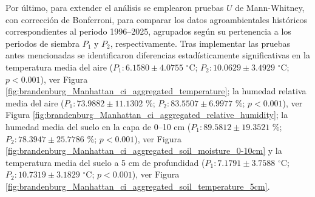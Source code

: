 Por último, para extender el análisis se emplearon pruebas $U$ de Mann-Whitney, con corrección de Bonferroni, para comparar los datos agroambientales históricos correspondientes al periodo 1996--2025, agrupados según su pertenencia a los periodos de siembra $P_1$ y $P_2$, respectivamente.  Tras implementar las pruebas antes mencionadas se identificaron diferencias estadísticamente significativas en la temperatura media del aire ($P_1:	6.1580	\pm	4.0755$ $^\circ$C; 	$P_2:	10.0629	\pm	3.4929$ $^\circ$C; 	$p<0.001$), ver Figura \ref{fig:brandenburg_Manhattan_ci_aggregated_temperature}; la humedad relativa media del aire ($P_1:	73.9882	\pm	11.1302	$ \%; 	$P_2:	83.5507\pm	6.9977$ \%; 	$p<0.001$), ver Figura \ref{fig:brandenburg_Manhattan_ci_aggregated_relative_humidity}; la humedad media del suelo en la capa de 0--10 cm ($P_1:	89.5812\pm	19.3521$ \%; 	$P_2:	78.3947\pm	25.7786$ \%; 	$p<0.001$), ver Figura \ref{fig:brandenburg_Manhattan_ci_aggregated_soil_moisture_0-10cm} y la temperatura media del suelo a 5 cm de profundidad ($P_1:	7.1791\pm	3.7588$ $^\circ$C; 	$P_2:	10.7319\pm	3.1829$ $^\circ$C; 	$p<0.001$), ver Figura \ref{fig:brandenburg_Manhattan_ci_aggregated_soil_temperature_5cm}.\\









